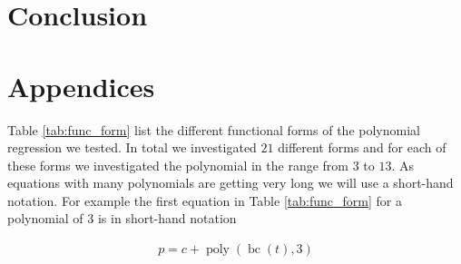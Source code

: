 \documentclass[12pt,a4paper]{article}
\DeclareMathOperator{\bc}{bc}
\DeclareMathOperator{\poly}{poly}
\begin{document}
\hypertarget{conclusion}{%
\section{Conclusion}\label{conclusion}}

\pagebreak

\setcounter{page}{3}
\printbibliography[title = References]
\cleardoublepage

\begin{refsection}
\nocite{R-base}
\nocite{R-stargazer}
\nocite{R-stringr}
\nocite{R-tidyr}
\nocite{R-dplyr}
\nocite{R-glmnet}
\nocite{R-class}
\nocite{R-MASS}
\nocite{R-plm}
\nocite{R-leaps}
\nocite{R-caret}
\nocite{R-tree}
\nocite{R-gbm}
\nocite{R-plotmo}
\nocite{R-pls}
\nocite{R-splines}
\nocite{R-tictoc}
\nocite{R-plotly}
\nocite{R-inspectdf}
\nocite{R-rpart}
\nocite{R-rpart.plot}
\nocite{R-stargazer}
\nocite{R-knitr}
\nocite{R-purrr}
\nocite{R-randomForest}
\nocite{R-rstudioapi}





\nocite{R-Studio}

\printbibliography[title = Software-References]
\end{refsection}

\cleardoublepage
\appendix
\setcounter{table}{0}
\setcounter{figure}{0}
\renewcommand{\thetable}{A\arabic{table}}
\renewcommand{\thefigure}{A\arabic{figure}}


\hypertarget{appendices}{%
\section{Appendices}\label{appendices}}

Table \ref{tab:func_form} list the different functional forms of the
polynomial regression we tested. In total we investigated \(21\)
different forms and for each of these forms we investigated the
polynomial in the range from \(3\) to \(13\). As equations with many
polynomials are getting very long we will use a short-hand notation. For
example the first equation in Table \ref{tab:func_form} for a polynomial
of \(3\) is in short-hand notation

\begin{align}
    p = c + \poly\left( \bc(t), 3 \right)
\end{align}
\end{document}
